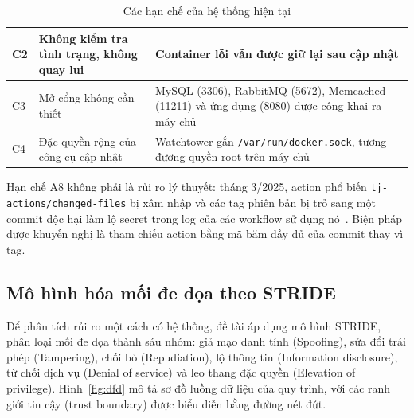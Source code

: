 \documentclass[12pt,a4paper,oneside]{extreport}
\begin{document}
\begin{table}[!htbp]
\begin{tabularx}{\textwidth}{|>{\centering\arraybackslash}p{}|>{\raggedright\arraybackslash}X|>{\raggedright\arraybackslash}X|}
    \hline
    C2 & Không kiểm tra tình trạng, không quay lui & Container lỗi vẫn được giữ lại sau cập nhật \\
    \hline
    C3 & Mở cổng không cần thiết & MySQL (3306), RabbitMQ (5672), Memcached (11211) và ứng dụng (8080) được công khai ra máy chủ \\
    \hline
    C4 & Đặc quyền rộng của công cụ cập nhật & Watchtower gắn \texttt{/var/run/docker.sock}, tương đương quyền root trên máy chủ \\
    \hline
  \end{tabularx}
  \caption{Các hạn chế của hệ thống hiện tại}
  \label{tab:current-limitations}
\end{table}
\FloatBarrier

Hạn chế A8 không phải là rủi ro lý thuyết: tháng 3/2025, action phổ biến
\texttt{tj-actions/changed-files} bị xâm nhập và các tag phiên bản bị trỏ sang
một commit độc hại làm lộ secret trong log của các workflow sử dụng
nó~\cite{cve-tj-actions}. Biện pháp được khuyến nghị là tham chiếu action bằng
mã băm đầy đủ của commit thay vì tag.

\subsection{Mô hình hóa mối đe dọa theo STRIDE}
Để phân tích rủi ro một cách có hệ thống, đề tài áp dụng mô hình STRIDE, phân
loại mối đe dọa thành sáu nhóm: giả mạo danh tính (Spoofing), sửa đổi trái phép
(Tampering), chối bỏ (Repudiation), lộ thông tin (Information disclosure), từ chối
dịch vụ (Denial of service) và leo thang đặc quyền (Elevation of privilege).
Hình~\ref{fig:dfd} mô tả sơ đồ luồng dữ liệu của quy trình, với các ranh giới tin
cậy (trust boundary) được biểu diễn bằng đường nét đứt.
\end{document}
